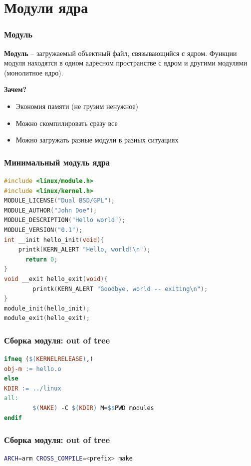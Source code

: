 \section{Модули ядра}
\begin{frame}
  \frametitle{Модуль}
\textbf{Модуль} -- загружаемый объектный файл, связывающийся с ядром.
\vspace{1cm}
Функции модуля находятся в одном адресном пространстве с ядром и другими модулями (монолитное ядро).
\vspace{0.5cm}
\begin{center}
  \textbf{Зачем?}
\end{center}
\begin{itemize}
  \item Экономия памяти (не грузим ненужное)
  \item Можно скомпилировать сразу все
  \item Можно загружать разные модули в разных ситуациях
\end{itemize}
\end{frame}
\begin{frame}[fragile]
  \frametitle{Минимальный модуль ядра}
\begin{lstlisting}[language=C]
#include <linux/module.h>
#include <linux/kernel.h>
MODULE_LICENSE("Dual BSD/GPL");
MODULE_AUTHOR("John Doe");
MODULE_DESCRIPTION("Hello world");
MODULE_VERSION("0.1");
int __init hello_init(void){
    printk(KERN_ALERT "Hello, world!\n");
      return 0;
}
void __exit hello_exit(void){
        printk(KERN_ALERT "Goodbye, world -- exiting\n");
}
module_init(hello_init);
module_exit(hello_exit);
\end{lstlisting}
\end{frame}

\begin{frame}[fragile]
  \frametitle{Сборка модуля: out of tree}
\begin{lstlisting}[language=make]
ifneq ($(KERNELRELEASE),)
obj-m := hello.o
else
KDIR := ../linux
all:
        $(MAKE) -C $(KDIR) M=$$PWD modules
endif
\end{lstlisting}
\end{frame}

\begin{frame}[fragile]
  \frametitle{Сборка модуля: out of tree}
\begin{lstlisting}[language=bash]
ARCH=arm CROSS_COMPILE=<prefix> make
\end{lstlisting}
\end{frame}


